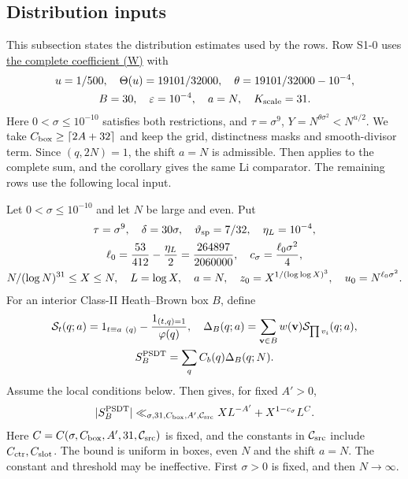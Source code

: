 \subsection{Distribution inputs}

This subsection states the distribution estimates used by the rows.
Row S1-0 uses \hyperref[sec:z1-input]{the complete coefficient \textup{(W)}} with
\[
\begin{gathered}
 u=1/500,\quad \Theta(u)=19101/32000,\quad\theta=19101/32000-10^{-4},\\
 B=30,\quad\varepsilon=10^{-4},\quad a=N,\quad K_{\rm scale}=31.
\end{gathered}
\]
Here $0<\sigma\le10^{-10}$ satisfies both restrictions, and
$\tau=\sigma^9$, $Y=N^{\theta\sigma^2}<N^{u/2}$.
We take $C_{\rm box}\ge\lceil2A+32\rceil$ and keep the grid, distinctness masks and smooth-divisor term.
Since $(q,2N)=1$, the shift $a=N$ is admissible.
Then \cite[Theorems~1.1--1.2, Corollary~1.3]{Z1} applies to the complete sum,
and the corollary gives the same Li comparator.
The remaining rows use the following local input.

\begingroup
\renewcommand{\thetheorem}{A}
\begin{theorem}\label{thm:distribution-input}
Let $0<\sigma\le10^{-10}$ and let $N$ be large and even.
Put
\[
\begin{gathered}
 \tau=\sigma^9,\quad\delta=30\sigma,\quad\vartheta_{\rm sp}=7/32,
 \quad\eta_L=10^{-4},\\
 \ell_0={53\over412}-{\eta_L\over2}={264897\over2060000},
 \quad c_\sigma={\ell_0\sigma^2\over4},\\
 N/(\log N)^{31}\le X\le N,\quad L=\log X,\quad
 a=N,\quad z_0=X^{1/(\log\log X)^3},\quad u_0=N^{\ell_0\sigma^2}.
\end{gathered}
\]
For an interior Class-II Heath--Brown box $B$, define
\[
\begin{gathered}
 \mathcal S_t(q;a)=1_{t\equiv a\ (q)}-{1_{(t,q)=1}\over\varphi(q)},\quad
 \Delta_B(q;a)=\sum_{\mathbf v\in B}w(\mathbf v)\mathcal S_{\prod v_i}(q;a),\\
 S_B^{\rm PSDT}=\sum_qC_b(q)\Delta_B(q;N).
\end{gathered}
\]
Assume the local conditions below.
Then \cite[Theorem~3.2, (3.13)]{Z1} gives, for fixed $A'>0$,
\begin{equation}\label{eq:distribution-input}
 |S_B^{\rm PSDT}|\ll_{\sigma,31,C_{\rm box},A',\mathcal C_{\rm src}}
 XL^{-A'}+X^{1-c_\sigma}L^C.
\end{equation}
Here $C=C(\sigma,C_{\rm box},A',31,\mathcal C_{\rm src})$ is fixed,
and the constants in $\mathcal C_{\rm src}$ include $C_{\rm ctr},C_{\rm slot}$.
The bound is uniform in boxes, even $N$ and the shift $a=N$.
The constant and threshold may be ineffective.
First $\sigma>0$ is fixed, and then $N\to\infty$.
\end{theorem}
\endgroup

